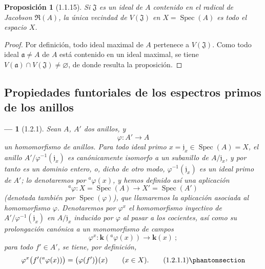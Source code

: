 \documentclass[oneside]{amsart}
\theoremstyle{ega-env-style}
\newtheorem*{env}{---}
\theoremstyle{ega-thm-env-style}
\newtheorem*{proposition}{Proposición}
\theoremstyle{ega-defn-env-style}
\let\EGAOriginalLabel\label
\renewcommand{\label}[1]{\phantomsection\EGAOriginalLabel{#1}}
\begin{document}
\begin{proposition}[1.1.15]
\label{I.1.1.15}
Si $\mathfrak{J}$ es un ideal de $A$ contenido en el radical de Jacobson $\mathfrak{R}(A)$, la única
vecindad de $V(\mathfrak{J})$ en $X=\operatorname{Spec}(A)$ es todo el espacio $X$.
\end{proposition}

\begin{proof}
Por definición, todo ideal maximal de $A$ pertenece a $V(\mathfrak{J})$.
Como todo ideal $\mathfrak{a}\neq A$ de $A$ está contenido en un ideal maximal, se tiene $V(\mathfrak{a})\cap V(\mathfrak{J})\neq\varnothing$, de donde resulta la proposición.
\end{proof}

\subsection{Propiedades funtoriales de los espectros primos de los anillos}
\label{subsection:I.1.2}

\begin{env}[1.2.1]
\label{I.1.2.1}
Sean $A$, $A'$ dos anillos, y
\[
  \varphi:A'\longrightarrow A
\]
un homomorfismo de anillos.
Para todo ideal primo $x=\mathfrak{j}_x\in\operatorname{Spec}(A)=X$, el anillo $A'/\varphi^{-1}(\mathfrak{j}_x)$ es canónicamente isomorfo a un subanillo de $A/\mathfrak{j}_x$, y por tanto es un dominio entero, o, dicho de otro modo, $\varphi^{-1}(\mathfrak{j}_x)$ es un ideal primo de $A'$;
lo denotaremos por ${}^a\varphi(x)$, y hemos definido así una aplicación
\[
  {}^a\varphi:X=\operatorname{Spec}(A)\longrightarrow
  X'=\operatorname{Spec}(A')
\]
(denotada también por $\operatorname{Spec}(\varphi)$), que llamaremos la aplicación \emph{asociada} al homomorfismo $\varphi$.
Denotaremos por $\varphi^x$ el homomorfismo inyectivo de $A'/\varphi^{-1}(\mathfrak{j}_x)$ en $A/\mathfrak{j}_x$ inducido por $\varphi$ al pasar a los cocientes, así como su prolongación canónica a un monomorfismo de campos
\[
  \varphi^x:\boldsymbol{k}({}^a\varphi(x))\longrightarrow\boldsymbol{k}(x)~;
\]
para todo $f'\in A'$, se tiene, por definición,
\begin{equation}
  \varphi^x\bigl(f'({}^a\varphi(x))\bigr)=\bigl(\varphi(f')\bigr)(x)
  \qquad(x\in X).
  \tag{1.2.1.1}\label{I.1.2.1.1-fr}
\end{equation}
\end{env}
\end{document}

